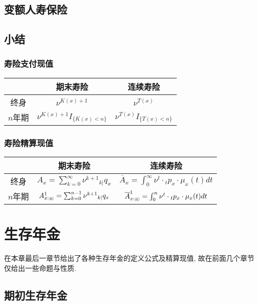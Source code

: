 \documentclass[lang=cn,10pt]{elegantbook}
\makeatletter
\DeclareRobustCommand{\annu}[1]{_{%
    \def\arraystretch{0}%
    \setlength\arraycolsep{1pt}%
    \setlength\arrayrulewidth{.2pt}%
    \begin{array}[b]{@{}c|}\hline
        \\[\arraycolsep]%
        \scriptstyle #1%
    \end{array}%
}}
\makeatother
\begin{document}
\section{变额人寿保险}

\section{小结}
\subsection{寿险支付现值}
\begin{center}
    \begin{tabular}{c|c|c}
        \hline
        & 期末寿险 & 连续寿险 \\
        \hline
        终身 & $\nu^{K(x)+1}$ & $\nu^{T(x)}$ \\
        \hline
        $n$年期 & $\nu^{K(x)+1}I_{\{K(x)<n\}}$ & $ \nu^{T(x)}I_{\{T(x)<n\}} $ \\
        \hline
    \end{tabular}
\end{center}

\subsection{寿险精算现值}
\begin{center}
    \begin{tabular}{c|c|c}
        \hline
        & 期末寿险 & 连续寿险 \\
        \hline
        终身 & ${A}_x=\sum_{k=0}^{\infty }{\nu^{k+1}{}_{k|}q_x}$ & $\overline{A}_x=\int_0^{\infty}{\nu^{t}\cdot {}_tp_x\cdot \mu_{x}(t)dt}$ \\
        \hline
        $n$年期 & ${A}_{x:}^1{}_{{}\annu{n}}=\sum_{k=0}^{n-1}{\nu^{k+1}{}_{k|}q_x}$ & $\overline{A}_{x:}^1{}_{{}\annu{n}}=\int_0^{n}{\nu^{t}\cdot {}_tp_x\cdot \mu_{x}(t)dt}$ \\
        \hline
    \end{tabular}
\end{center}

\chapter{生存年金}
在本章最后一章节给出了各种生存年金的定义公式及精算现值, 故在前面几个章节仅给出一些命题与性质. 
\section{期初生存年金}
\end{document}
